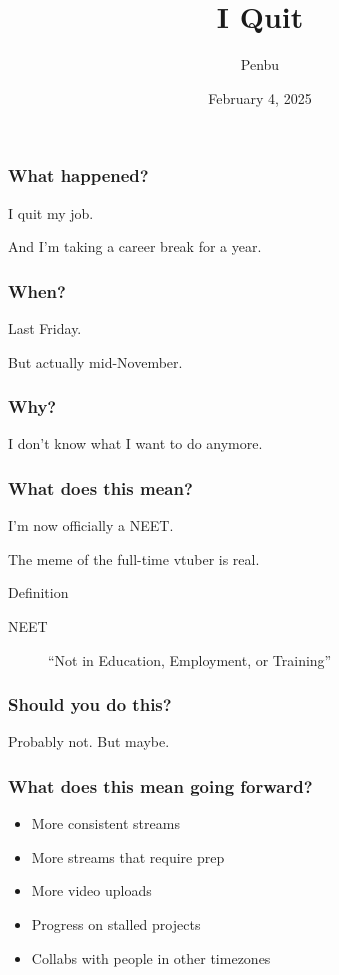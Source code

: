 \documentclass[lualatex,aspectratio=169]{beamer}
\title{I Quit}
\author{Penbu}
\date{February 4, 2025}
\begin{document}

  \begin{frame}
    \frametitle{What happened?}
    \pause
    I quit \pause my job.

    \pause
    And I'm taking a career break for a year.
  \end{frame}

  \begin{frame}
    \frametitle{When?}
    \pause
    Last Friday.

    \pause
    But actually mid-November.
  \end{frame}

  \begin{frame}
    \frametitle{Why?}
    \pause

    I don't know what I want to do anymore.
  \end{frame}

  \begin{frame}
    \frametitle{What does this mean?}
    \pause I'm now officially a NEET\@.

    \pause The meme of the full-time vtuber is real.

    \pause
    \vfill

    \begin{block}{Definition}
      \begin{description}
        \item[NEET] ``Not in Education, Employment, or Training''
      \end{description}
    \end{block}
  \end{frame}

  \begin{frame}
    \frametitle{Should you do this?}
    \pause
    Probably not.
    \pause
    But maybe.
  \end{frame}

  \begin{frame}
    \frametitle{What does this mean going forward?}
    \pause
    \begin{itemize}[<+->]
      \item More consistent streams
      \item More streams that require prep
      \item More video uploads
      \item Progress on stalled projects
      \item Collabs with people in other timezones
    \end{itemize}
  \end{frame}
\end{document}
